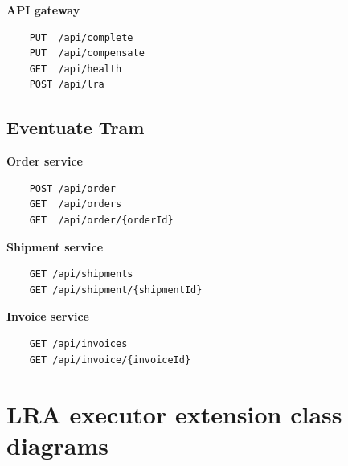 \documentclass[oneside,
  digital, %
  table,   %
  nolof,     %
  nolot,     %
]{fithesis3}
\begin{document}
\noindent
\textbf{API gateway}

\begin{verbatim}
    PUT  /api/complete
    PUT  /api/compensate
    GET  /api/health
    POST /api/lra
\end{verbatim}


\section{Eventuate Tram}

\textbf{Order service}

\begin{verbatim}
    POST /api/order
    GET  /api/orders
    GET  /api/order/{orderId}
\end{verbatim}

\noindent
\textbf{Shipment service}

\begin{verbatim}
    GET /api/shipments
    GET /api/shipment/{shipmentId}
\end{verbatim}

\noindent
\textbf{Invoice service}

\begin{verbatim}
    GET /api/invoices
    GET /api/invoice/{invoiceId}
\end{verbatim}


\chapter{LRA executor extension class diagrams}
\label{sec:appendix-class-diagrams}
\end{document}
